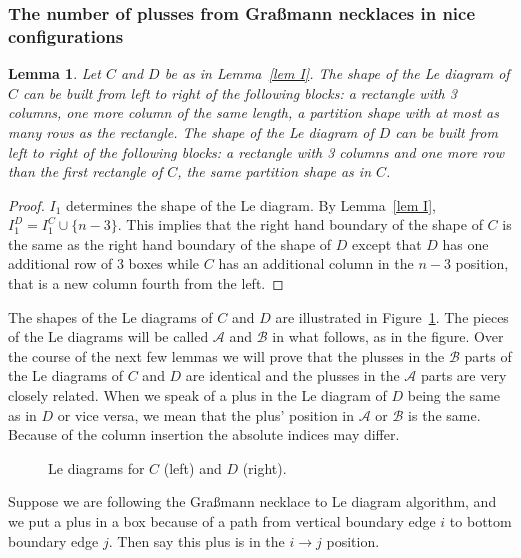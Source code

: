 \documentclass[11pt]{article}
\newtheorem{lem}[thm]{Lemma}
\theoremstyle{remark}
\theoremstyle{definition}
\begin{document}
\subsubsection{The number of plusses from Gra\ss mann necklaces in nice configurations}

\begin{lem}\label{lem shape}
  Let $C$ and $D$ be as in Lemma~\ref{lem I}.
  The shape of the Le diagram of $C$ can be built from left to right of the following blocks: a rectangle with 3 columns, one more column of the same length, a partition shape with at most as many rows as the rectangle.
  The shape of the Le diagram of $D$ can be built from left to right of the following blocks: a rectangle with 3 columns and one more row than the first rectangle of $C$, the same partition shape as in $C$.
\end{lem}

\begin{proof}
  $I_1$ determines the shape of the Le diagram.
  By Lemma~\ref{lem I}, $I_1^{D} = I_1^{C}\cup \{n-3\}$.  This implies that the right hand boundary of the shape of $C$ is the same as the right hand boundary of the shape of $D$ except that $D$ has one additional row of 3 boxes while $C$ has an additional column in the $n-3$ position, that is a new column fourth from the left.
\end{proof}

The shapes of the Le diagrams of $C$ and $D$ are illustrated in Figure~\ref{fig Le}.  The pieces of the Le diagrams will be called $\mathcal{A}$ and $\mathcal{B}$ in what follows, as in the figure.  Over the course of the next few lemmas we will prove that the plusses in the $\mathcal{B}$ parts of the Le diagrams of $C$ and $D$ are identical and the plusses in the $\mathcal{A}$ parts are very closely related.  When we speak of a plus in the Le diagram of $D$ being the same as in $D$ or vice versa, we mean that the plus' position in $\mathcal{A}$ or $\mathcal{B}$ is the same.  Because of the column insertion the absolute indices may differ.

\begin{figure}
  \caption{Le diagrams for $C$ (left) and $D$ (right).}\label{fig Le}
\end{figure}

Suppose we are following the Gra\ss mann necklace to Le diagram algorithm, and we put a plus in a box because of a path from vertical boundary edge $i$ to bottom boundary edge $j$.  Then say this plus is in the $i\rightarrow j$ position.
\end{document}
